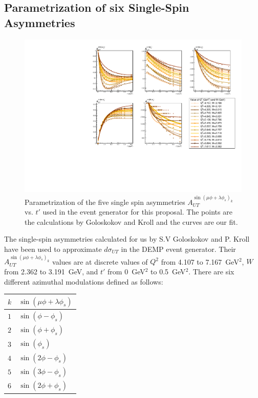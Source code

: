 \subsection{Parametrization of six Single-Spin Asymmetries
\label{sec:asymparametrizations}}

\begin{figure}[!hbt]
    \centering
    \includegraphics[width=6.0in]{./figures/AsymPlots.pdf}
    \caption{Parametrization of the five single spin asymmetries
      $A_{UT}^{\sin(\mu\phi+\lambda\phi_s)_k}$ vs. $t'$ used in the event
      generator for this proposal.  The points are the calculations by
      Goloskokov and Kroll \cite{GoPC} and the curves are our fit.}
    \label{fig:asym-1}
\end{figure}

The single-spin asymmetries calculated for us by S.V Goloskokov and P. Kroll
\cite{GoPC} have been used to approximate $d\sigma_{UT}$ in the
DEMP event generator.  Their $A_{UT}^{\sin(\mu\phi+\lambda\phi_s)_k}$ values are
at discrete values of $Q^2$ from 4.107 to 7.167~GeV$^2$, $W$ from 2.362 to
3.191~GeV, and $t'$ from 0~GeV$^2$ to 0.5~GeV$^2$.  There are six different 
azimuthal modulations defined as follows:
\begin{center}
\begin{tabular}{ l|l }
  $k$ & $\sin(\mu\phi+\lambda\phi_s)$ \\
  \hline
  $1$ & $\sin(\phi-\phi_s)$ \\
  $2$ & $\sin(\phi+\phi_s)$ \\
  $3$ & $\sin(\phi_s)$ \\
  $4$ & $\sin(2\phi-\phi_s)$ \\
  $5$ & $\sin(3\phi-\phi_s)$ \\
  $6$ & $\sin(2\phi+\phi_s)$
\end{tabular}
\end{center}

